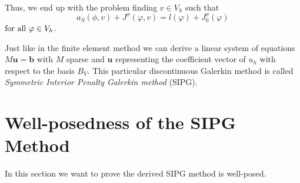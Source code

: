Thus, we end up with the problem finding $v \in V_h$ such that
\[
	a_S(\phi,v) + J^\sigma(\varphi,v) = l(\varphi) + J^\sigma_0(\varphi)
\] 
$  \textnormal{for all } \varphi \in V_h$. 

Just like in the finite element method we can derive a linear system of equations $M \mathbf{u} = \mathbf{b}$ with $M$ sparse and $\mathbf{u}$ representing the coefficient vector of $u_h$ with respect to the basis $B_V$.
This particular discontinuous Galerkin method is called \emph{Symmetric Interior Penalty Galerkin method} (SIPG).

\section{Well-posedness of the SIPG Method}

In this section we want to prove the derived SIPG method is well-posed.

